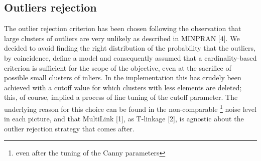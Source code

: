 \documentclass[12pt]{article}
\begin{document}
\subsection{Outliers rejection}
The outlier rejection criterion has been chosen following the observation that large clusters of outliers are very unlikely as described in MINPRAN [4]. We decided to avoid finding the right distribution of the probability that the outliers, by coincidence, define a model and consequently assumed that a cardinality-based criterion is sufficient for the scope of the objective, even at the sacrifice of possible small clusters of inliers. In the implementation this has crudely been achieved with a cutoff value for which clusters with less elements are deleted; this, of course, implied a process of fine tuning of the cutoff parameter. The underlying reason for this choice can be found in the non-comparable \footnote{even after the tuning of the Canny parameters} noise level in each picture, and that MultiLink [1], as T-linkage [2], is agnostic about the outlier rejection strategy that comes after.
\end{document}
